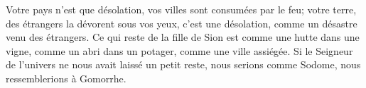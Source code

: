 Votre pays n’est que désolation, vos villes sont consumées par le feu;
	votre terre, des étrangers la dévorent sous vos yeux,
	c’est une désolation, comme un désastre venu des étrangers.
Ce qui reste de la fille de Sion est comme une hutte dans une vigne,
	comme un abri dans un potager, comme une ville assiégée.
Si le Seigneur de l’univers ne nous avait laissé un petit reste,
	nous serions comme Sodome, nous ressemblerions à Gomorrhe.
